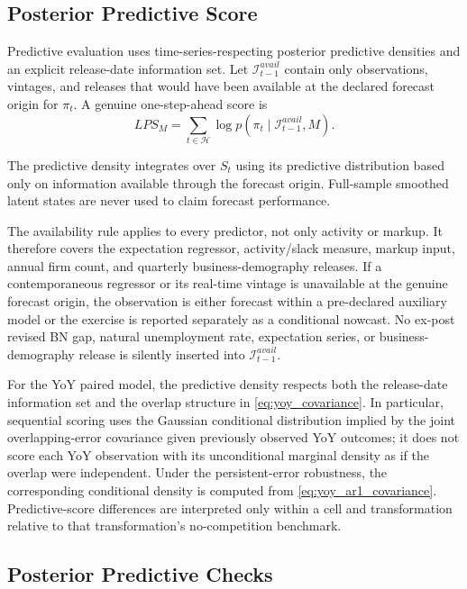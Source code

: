 \documentclass[11pt]{article}
\begin{document}
\subsection{Posterior Predictive Score}

Predictive evaluation uses time-series-respecting posterior predictive densities and an explicit release-date information set. Let $\mathcal I_{t-1}^{avail}$ contain only observations, vintages, and releases that would have been available at the declared forecast origin for $\pi_t$. A genuine one-step-ahead score is
\begin{equation}
LPS_M
=
\sum_{t\in\mathcal H}
\log p\!\left(\pi_t\mid\mathcal I_{t-1}^{avail},M\right).
\label{eq:lps}
\end{equation}

The predictive density integrates over $S_t$ using its predictive distribution based only on information available through the forecast origin. Full-sample smoothed latent states are never used to claim forecast performance.

The availability rule applies to every predictor, not only activity or markup. It therefore covers the expectation regressor, activity/slack measure, markup input, annual firm count, and quarterly business-demography releases. If a contemporaneous regressor or its real-time vintage is unavailable at the genuine forecast origin, the observation is either forecast within a pre-declared auxiliary model or the exercise is reported separately as a conditional nowcast. No ex-post revised BN gap, natural unemployment rate, expectation series, or business-demography release is silently inserted into $\mathcal I_{t-1}^{avail}$.

For the YoY paired model, the predictive density respects both the release-date information set and the overlap structure in \cref{eq:yoy_covariance}. In particular, sequential scoring uses the Gaussian conditional distribution implied by the joint overlapping-error covariance given previously observed YoY outcomes; it does not score each YoY observation with its unconditional marginal density as if the overlap were independent. Under the persistent-error robustness, the corresponding conditional density is computed from \cref{eq:yoy_ar1_covariance}. Predictive-score differences are interpreted only within a cell and transformation relative to that transformation's no-competition benchmark.

\subsection{Posterior Predictive Checks}
\end{document}
